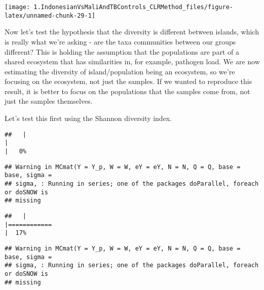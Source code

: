 \documentclass[]{article}
\newenvironment{Shaded}{\begin{snugshade}}{\end{snugshade}}
\newcommand{\CommentTok}[1]{\textcolor[rgb]{0.56,0.35,0.01}{\textit{#1}}}
\newcommand{\DataTypeTok}[1]{\textcolor[rgb]{0.13,0.29,0.53}{#1}}
\newcommand{\DecValTok}[1]{\textcolor[rgb]{0.00,0.00,0.81}{#1}}
\newcommand{\KeywordTok}[1]{\textcolor[rgb]{0.13,0.29,0.53}{\textbf{#1}}}
\newcommand{\NormalTok}[1]{#1}
\newcommand{\OperatorTok}[1]{\textcolor[rgb]{0.81,0.36,0.00}{\textbf{#1}}}
\newcommand{\StringTok}[1]{\textcolor[rgb]{0.31,0.60,0.02}{#1}}
\begin{document}
\begin{center}\texttt{[image: 1.IndonesianVsMaliAndTBControls\_CLRMethod\_files/figure-latex/unnamed-chunk-29-1]} \end{center}

Now let's test the hypothesis that the diversity is different between
islands, which is really what we're asking - are the taxa communities
between our groups different? This is holding the assumption that the
populations are part of a shared ecosystem that has similarities in, for
example, pathogen load. We are now estimating the diversity of
island/population being an ecosystem, so we're focusing on the
ecosystem, not just the samples. If we wanted to reproduce this result,
it is better to focus on the populations that the samples come from, not
just the samples themselves.

Let's test this first using the Shannon diversity index.

\begin{Shaded}
\end{Shaded}

\begin{verbatim}
##   |                                                                              |                                                                      |   0%
\end{verbatim}

\begin{verbatim}
## Warning in MCmat(Y = Y_p, W = W, eY = eY, N = N, Q = Q, base = base, sigma =
## sigma, : Running in series; one of the packages doParallel, foreach or doSNOW is
## missing
\end{verbatim}

\begin{verbatim}
##   |                                                                              |============                                                          |  17%
\end{verbatim}

\begin{verbatim}
## Warning in MCmat(Y = Y_p, W = W, eY = eY, N = N, Q = Q, base = base, sigma =
## sigma, : Running in series; one of the packages doParallel, foreach or doSNOW is
## missing
\end{verbatim}
\end{document}
